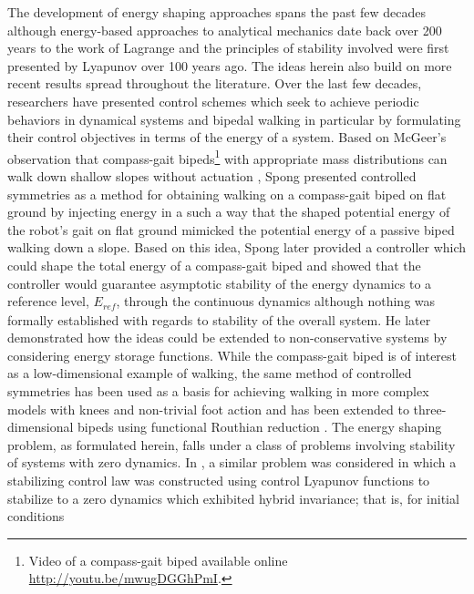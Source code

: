 \documentclass[english]{article}
\begin{document}
The development of energy shaping approaches spans the past few decades
although energy-based approaches to analytical mechanics date back over 200
years to the work of Lagrange
and the principles of stability involved were first presented by Lyapunov
over 100 years ago.
% 
The ideas herein also build on more recent results spread throughout the literature.
%
Over the last few decades, researchers have presented control schemes which seek
to achieve periodic behaviors in dynamical systems and bipedal walking in
particular by formulating their control objectives in terms of the energy of a
system.
%
Based on McGeer's observation that compass-gait
bipeds\footnote{\label{fn:cg-url}%
  Video of a compass-gait biped available online
  \href{http://youtu.be/mwugDGGhPmI}{http://youtu.be/mwugDGGhPmI}.%
} with appropriate mass distributions can walk down shallow slopes without
actuation \cite{McGeer1990}, Spong presented controlled symmetries
\cite{Spong2007} as a method for obtaining walking on a compass-gait biped on
flat ground by injecting energy in a such a way that the shaped potential energy
of the robot's gait on flat ground mimicked the potential energy of a passive
biped walking down a slope.
%
% 
Based on this idea, Spong later provided a controller which could shape the
total energy of a compass-gait biped and showed that the controller would
guarantee asymptotic stability of the energy dynamics to a reference level,
$E_{\mathit{ref}}$, through the continuous dynamics although nothing was
formally established with regards to stability of the overall system.
%
He later demonstrated how the ideas could be extended to non-conservative
systems \cite{Spong2007} by considering energy storage functions.
%
While the compass-gait biped is of interest as a low-dimensional example of
walking, the same method of controlled symmetries has been used as a basis for
achieving walking in more complex models with knees and non-trivial foot action
\cite{Sinnet2009} and has been extended to three-dimensional bipeds using
functional Routhian reduction \cite{Sinnet2009a}.
%
The energy shaping problem, as formulated herein, falls under a class of
problems involving stability of systems with zero dynamics.
%
In \cite{Ames2014}, a similar problem was considered in which a stabilizing
control law was constructed using control Lyapunov functions to stabilize to a
zero dynamics which exhibited hybrid invariance; that is, for initial conditions
\end{document}
